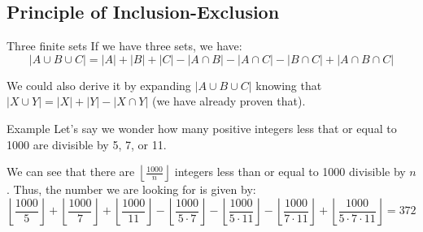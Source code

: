 \documentclass[a4paper]{article}
\begin{document}
\subsection{Principle of Inclusion-Exclusion}
\begin{parag}{Three finite sets}
    If we have three sets, we have:
    \[\left|A \cup B \cup C\right| = \left|A\right| + \left|B\right| + \left|C\right| - \left|A \cap B\right| - \left|A \cap C\right| - \left|B \cap C\right| + \left|A \cap B \cap C\right|\]


    We could also derive it by expanding $\left|A \cup B \cup C\right|$ knowing that $\left|X \cup Y\right| = \left|X\right| + \left|Y\right| - \left|X \cap Y\right|$ (we have already proven that).
\end{parag}

\begin{parag}{Example}
    Let's say we wonder how many positive integers less that or equal to 1000 are divisible by 5, 7, or 11.

    We can see that there are $\left\lfloor \frac{1000}{n} \right\rfloor $ integers less than or equal to 1000 divisible by $n$. Thus, the number we are looking for is given by:
    \[\left\lfloor \frac{1000}{5} \right\rfloor + \left\lfloor \frac{1000}{7} \right\rfloor + \left\lfloor \frac{1000}{11} \right\rfloor - \left\lfloor \frac{1000}{5\cdot 7} \right\rfloor - \left\lfloor \frac{1000}{5\cdot 11} \right\rfloor - \left\lfloor \frac{1000}{7\cdot 11} \right\rfloor + \left\lfloor \frac{1000}{5\cdot 7\cdot 11} \right\rfloor = 372\]
\end{parag}
\end{document}
